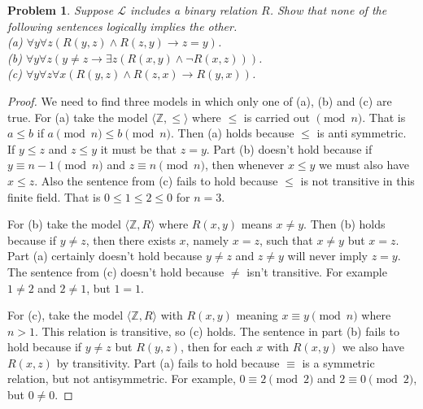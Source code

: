 \documentclass{article}
\newtheorem{problem}{Problem}
\begin{document}
\begin{problem}
Suppose $\mathcal{L}$ includes a binary relation $R$. Show that none of the following sentences logically implies the other.\\
(a) $\forall y \forall z (R(y,z) \wedge R(z,y) \rightarrow z = y)$.\\
(b) $\forall y \forall z (y \neq z \rightarrow \exists z (R(x,y) \wedge \neg R(x,z)))$.\\
(c) $\forall y \forall z \forall x (R(y,z) \wedge R(z,x) \rightarrow R(y,x))$.
\end{problem}
\begin{proof}
We need to find three models in which only one of (a), (b) and (c) are true. For (a) take the model $\langle \mathbb{Z}, \leq \rangle$ where $\leq$ is carried out $\pmod{n}$. That is $a \leq b$ if $a \pmod{n} \leq b \pmod{n}$. Then (a) holds because $\leq$ is anti symmetric. If $y \leq z$ and $z \leq y$ it must be that $z = y$. Part (b) doesn't hold because if $y \equiv n-1 \pmod{n}$ and $z \equiv n \pmod{n}$, then whenever $x \leq y$ we must also have $x \leq z$. Also the sentence from (c) fails to hold because $\leq$ is not transitive in this finite field. That is $0 \leq 1 \leq 2 \leq 0$ for $n = 3$.

For (b) take the model $\langle \mathbb{Z}, R \rangle$ where $R(x,y)$ means $x \neq y$. Then (b) holds because if $y \neq z$, then there exists $x$, namely $x = z$, such that $x \neq y$ but $x = z$. Part (a) certainly doesn't hold because $y \neq z$ and $z \neq y$ will never imply $z = y$. The sentence from (c) doesn't hold because $\neq$ isn't transitive. For example $1 \neq 2$ and $2 \neq 1$, but $1 = 1$.

For (c), take the model $\langle \mathbb{Z}, R \rangle$ with $R(x,y)$ meaning $x \equiv y \pmod{n}$ where $n > 1$. This relation is transitive, so (c) holds. The sentence in part (b) fails to hold because if $y \neq z$ but $R(y,z)$, then for each $x$ with $R(x,y)$ we also have $R(x,z)$ by transitivity. Part (a) fails to hold because $\equiv$ is a symmetric relation, but not antisymmetric. For example, $0 \equiv 2 \pmod{2}$ and $2 \equiv 0 \pmod{2}$, but $0 \neq 0$.
\end{proof}
\end{document}
